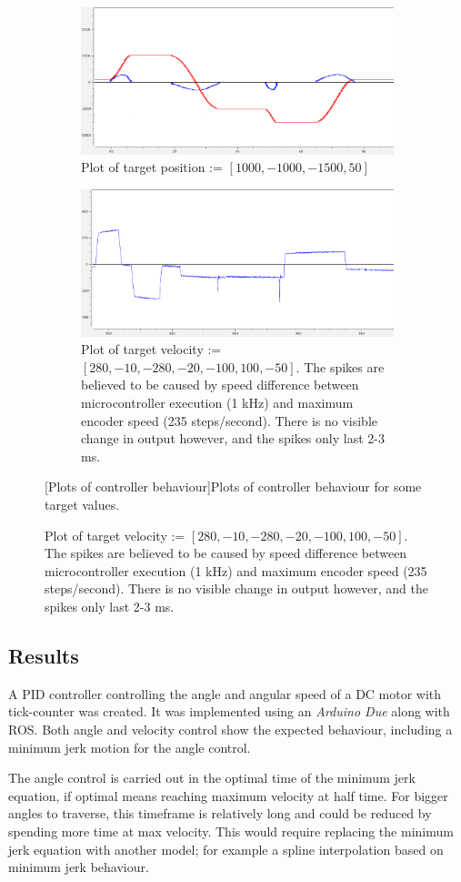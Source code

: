 \documentclass[11pt]{article}
\begin{document}
\begin{figure}[h]
  \centering
  \begin{subfigure}[b]{.9\textwidth}
    \centering
    \includegraphics[width=.9\textwidth]{figures/posplot.png}
    \caption{\scriptsize Plot of target position := $[{1000}, {-1000}, {-1500}, 50]$}\label{fig:pos}\vspace{20pt}
  \end{subfigure} 
  \begin{subfigure}[b]{.9\textwidth}
    \centering
    \includegraphics[width=.9\textwidth]{figures/velplot.png}
    \caption{\scriptsize Plot of target velocity := $[280, {-10}, {-280}, {-20}, {-100}, 100, {-50}]$. The spikes are believed to be caused by speed difference between microcontroller execution (1 kHz) and maximum encoder speed (235 steps/second). There is no visible change in output however, and the spikes only last 2-3 ms.}    \label{fig:vel}
  \end{subfigure}
  [Plots of controller behaviour]{Plots of controller behaviour for some target values.}
\end{figure}
\subsection{Results}
A PID controller controlling the angle and angular speed of a DC motor with tick-counter was created. It was implemented using an \emph{Arduino Due} along with ROS. Both angle and velocity control show the expected behaviour, including a minimum jerk motion for the angle control.\par
The angle control is carried out in the optimal time of the minimum jerk equation, if optimal means reaching maximum velocity at half time. For bigger angles to traverse, this timeframe is relatively long and could be reduced by spending more time at max velocity. This would require replacing the minimum jerk equation with another model; for example a spline interpolation based on minimum jerk behaviour.
\end{document}
